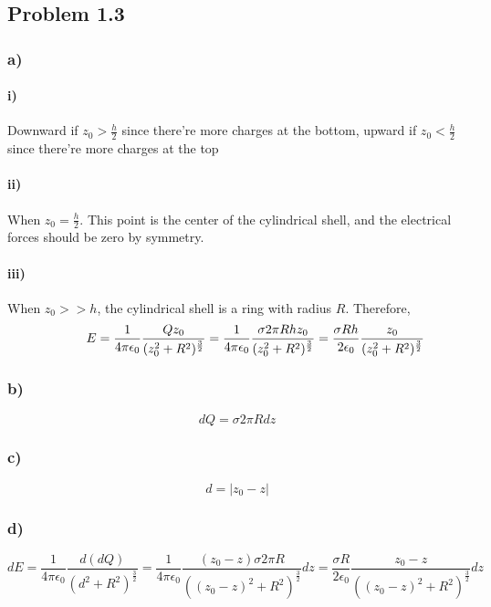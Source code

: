 \documentclass[../homework.tex]{subfiles}
\begin{document}
\subsection{Problem 1.3}
\subsubsection*{a)}
\setlength{\leftskip}{1cm}
\paragraph*{i)}
Downward if $z_0 > \frac{h}{2}$ since there're more charges at the bottom, upward if $z_0 < \frac{h}{2}$ since there're more charges at the top
\paragraph*{ii)}
When $z_0 = \frac{h}{2}$. This point is the center of the cylindrical shell, and the electrical forces should be zero by symmetry.
\paragraph*{iii)}
When $z_0 >>h$, the cylindrical shell is a ring with radius $R$. Therefore,
\begin{equation*}
    \hspace*{1cm} E = \frac{1}{4\pi \epsilon_0} \frac{Qz_0}{(z_0^2 + R^2)^\frac{3}{2}} = \frac{1}{4\pi \epsilon_0} \frac{\sigma 2 \pi R h z_0}{(z_0^2 + R^2)^\frac{3}{2}} = \frac{\sigma R h}{2 \epsilon_0} \frac{z_0}{(z_0^2 + R^2)^\frac{3}{2}}
\end{equation*}
\setlength{\leftskip}{0cm}
\subsubsection*{b)}
\begin{equation*}
    dQ = \sigma 2\pi R dz
\end{equation*}
\subsubsection*{c)}
\begin{equation*}
    d = |{z_0 - z}|
\end{equation*}
\subsubsection*{d)}
\begin{equation*}
    dE = \frac{1}{4\pi \epsilon_0} \frac{d(dQ)}{(d^2 + R^2)^\frac{3}{2}} = \frac{1}{4\pi \epsilon_0} \frac{(z_0 - z)\sigma 2 \pi R}{((z_0-z)^2 + R^2)^\frac{3}{2}} dz = \frac{\sigma R}{2\epsilon_0} \frac{z_0 - z}{((z_0-z)^2 + R^2)^\frac{3}{2}} dz
\end{equation*}
\end{document}
